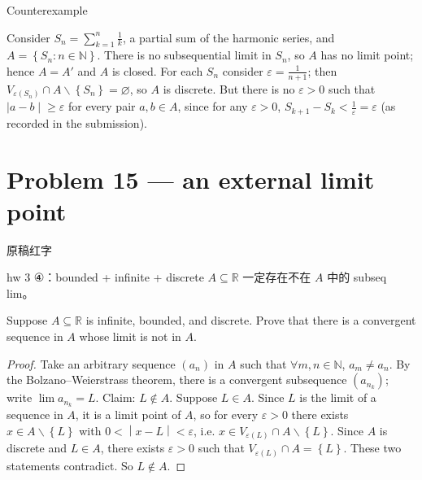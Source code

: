 \begin{qlsolution}{Counterexample}

Consider \(S_{n} = \sum_{k = 1}^{n}\frac{1}{k}\), a partial sum of the harmonic series, and \(A = \left\{ {S_{n}:n \in \mathbb{N}} \right\}\). There is no subsequential limit in \(S_{n}\), so \(A\) has no limit point; hence \(A = A'\) and \(A\) is closed. For each \(S_{n}\) consider \(\varepsilon = \frac{1}{n + 1}\); then \(V_{\varepsilon{(S_{n})}} \cap A \smallsetminus \left\{ S_{n} \right\} = \varnothing\), so \(A\) is discrete. But there is no \(\varepsilon > 0\) such that \(\left. |a - b \middle| \geq \varepsilon \right.\) for every pair \(a,b \in A\), since for any \(\varepsilon > 0\), \(S_{k + 1} - S_{k} < \frac{1}{\varepsilon} = \varepsilon\) (as recorded in the submission).

\end{qlsolution}

\section{Problem 15 --- an external limit point}

\begin{qlnote}{原稿红字}

hw 3 ④：bounded + infinite + discrete \(A \subseteq \mathbb{R}\) 一定存在不在 \(A\) 中的 subseq lim。

\end{qlnote}

Suppose \(A \subseteq \mathbb{R}\) is infinite, bounded, and discrete. Prove that there is a convergent sequence in \(A\) whose limit is not in \(A\).

\begin{proof}

Take an arbitrary sequence \(\left( a_{n} \right)\) in \(A\) such that \(\forall m,n \in \mathbb{N}\), \(a_{m} \neq a_{n}\). By the Bolzano--Weierstrass theorem, there is a convergent subsequence \(\left( a_{n_{k}} \right)\); write \(\lim a_{n_{k}} = L\). Claim: \(L \notin A\). Suppose \(L \in A\). Since \(L\) is the limit of a sequence in \(A\), it is a limit point of \(A\), so for every \(\varepsilon > 0\) there exists \(x \in A \smallsetminus \left\{ L \right\}\) with \(\left. 0 < \middle| x - L \middle| < \varepsilon \right.\), i.e. \(x \in V_{\varepsilon{(L)}} \cap A \smallsetminus \left\{ L \right\}\). Since \(A\) is discrete and \(L \in A\), there exists \(\varepsilon > 0\) such that \(V_{\varepsilon{(L)}} \cap A = \left\{ L \right\}\). These two statements contradict. So \(L \notin A\).

\end{proof}
